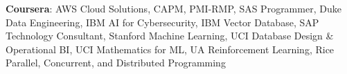 \textbf{Coursera}: AWS Cloud Solutions, CAPM, PMI-RMP, SAS Programmer, Duke Data Engineering, IBM AI for Cybersecurity, IBM Vector Database, SAP Technology Consultant, Stanford Machine Learning, UCI Database Design \& Operational BI, UCI Mathematics for ML, UA Reinforcement Learning, Rice Parallel, Concurrent, and Distributed Programming

